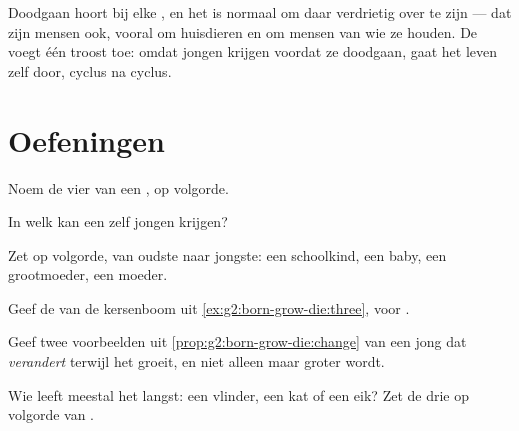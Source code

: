 \begin{remark}\label{rem:g2:born-grow-die:death}
Doodgaan hoort bij elke , en het is normaal om daar
verdrietig over te zijn --- dat zijn mensen ook, vooral om huisdieren
en om mensen van wie ze houden. De  voegt één troost toe: omdat
 jongen krijgen voordat ze doodgaan, gaat het leven zelf
door, cyclus na cyclus.
\end{remark}

\section{Oefeningen}

\begin{exercise}[$\star$]\label{exo:g2:born-grow-die:1}
Noem de vier  van een , op volgorde.
\end{exercise}

\begin{exercise}[$\star$]\label{exo:g2:born-grow-die:2}
In welk  kan een  zelf jongen krijgen?
\end{exercise}

\begin{exercise}[$\star$]\label{exo:g2:born-grow-die:3}
Zet op volgorde, van oudste naar jongste: een schoolkind, een baby, een
grootmoeder, een moeder.
\end{exercise}

\begin{exercise}[$\star$]\label{exo:g2:born-grow-die:4}
Geef de  van de kersenboom uit
\cref{ex:g2:born-grow-die:three},  voor .
\end{exercise}

\begin{exercise}[$\star$]\label{exo:g2:born-grow-die:5}
Geef twee voorbeelden uit \cref{prop:g2:born-grow-die:change} van een
jong  dat \emph{verandert} terwijl het groeit, en niet
alleen maar groter wordt.
\end{exercise}

\begin{exercise}[$\star$]\label{exo:g2:born-grow-die:6}
Wie leeft meestal het langst: een vlinder, een kat of een eik? Zet de
drie op volgorde van .
\end{exercise}


